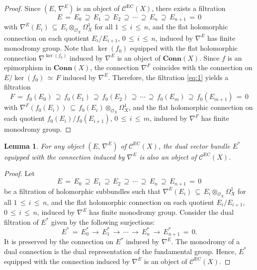 \documentclass[12pt]{amsart}
\newtheorem{lemma}[theorem]{Lemma}
\theoremstyle{definition}
\numberwithin{equation}{section}
\newcommand{\EC}{\mathcal{C}^\mathrm{EC}}
\begin{document}
\begin{proof}
Since $(E,\, \nabla^E)$ is an object of $\EC(X)$, there exists a filtration
\begin{equation}\label{eq:1}
E\,=\,E_0\, \supseteq\, E_1\, \supseteq\, E_2\, \supseteq\, \cdots\,\supseteq\, E_n\,\supseteq\, 
E_{n+1} \,=\, 0
\end{equation}
with $\nabla^E(E_i)\, \subseteq\, E_i \otimes_{\mathcal{O}_X} \Omega_X^1$ for all $1\, \leq\, i\,
\leq\, n$, and the flat holomorphic connection on each quotient
$E_i/E_{i+1}$, $0\, \leq\, i\, \leq\, n$, induced by $\nabla^E$ has finite monodromy group.
Note that $\ker(f_0)$ equipped with the flat holomorphic connection $\nabla^{\ker(f_0)}$ 
induced by $\nabla^E$ is an object of $\mathbf{Conn}(X)$. Since $f$ is an epimorphism in 
$\mathbf{Conn}(X)$, the connection $\nabla^F$ coincides with the connection on 
$E/\ker(f_0)\,\simeq\, F$ induced by $\nabla^E$. Therefore, the filtration \eqref{eq:1} 
yields a filtration
$$
F\,=\,f_0(E_0)\, \supseteq\, f_0(E_1)\, \supseteq\, f_0(E_2)\, \supseteq\, \cdots\,\supseteq\,
f_0(E_m)\,\supseteq\, f_0(E_{m+1}) \,=\, 0
$$
with $\nabla^F(f_0(E_i))\, \subseteq\, f_0(E_i) \otimes_{\mathcal{O}_X} \Omega_X^1$, and the flat 
holomorphic connection on each quotient $f_0(E_i)/f_0(E_{i+1})$, $0\, 
\leq\, i\, \leq\, m$, induced by $\nabla^F$ has finite monodromy group.
\end{proof}

\begin{lemma}\label{lem-t}
For any object $(E,\, \nabla^E)$ of $\EC(X)$, the dual vector bundle $E^*$ equipped with the
connection induced by $\nabla^E$ is also an object of $\EC(X)$.
\end{lemma}

\begin{proof}
Let 
$$
E\,=\,E_0\, \supseteq\, E_1\, \supseteq\, E_2\, \supseteq\, \cdots\,\supseteq\, E_n\,\supseteq\, 
E_{n+1} \,=\, 0
$$
be a filtration of holomorphic subbundles such that $\nabla^E(E_i)\, \subseteq\, E_i
\otimes_{\mathcal{O}_X} \Omega_X^1$ for all $1\, \leq\, i\,
\leq\, n$, and the flat holomorphic connection on each quotient
$E_i/E_{i+1}$, $0\, \leq\, i\, \leq\, n$, induced by $\nabla^E$ has finite monodromy group.
Consider the dual filtration of $E^*$ given by the following surjections:
$$
E^*\,=\,E^*_0\, \longrightarrow\, E^*_1\, \longrightarrow\, \cdots\,\longrightarrow \, E^*_n
\,\longrightarrow\, E^*_{n+1} \,=\, 0.
$$
It is preserved by the connection on $E^*$ induced by $\nabla^E$. The monodromy of
a dual connection is the dual representation of the fundamental group. Hence, $E^*$ equipped 
with the connection induced by $\nabla^E$ is an object of $\EC(X)$.
\end{proof}
\end{document}
